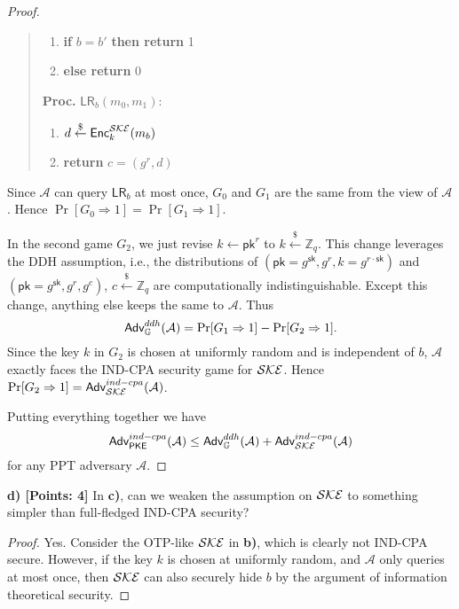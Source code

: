 \documentclass[12pt]{article}
\newcommand{\Z}{\mathbb{Z}}
\newcommand{\getsr}{\stackrel{\$}{\gets}}
\newcommand{\Adv}{\textsf{Adv}}
\theoremstyle{definition}
\newcommand{\PKE}{\textsf{PKE}}
\newcommand{\Enc}{\textsf{Enc}}
\newcommand{\pk}{\textsf{pk}}
\newcommand{\sk}{\textsf{sk}}
\newcommand{\A}{\mathcal{A}}
\newcommand{\LR}{\textsf{LR}}
\begin{document}
\begin{proof}
\begin{quote}
\begin{minipage}[t]{0.4\textwidth}
\begin{enumerate}
\item {\bf if} $b=b'$ {\bf then return} 1
\item {\bf else return} 0
\end{enumerate}
\end{minipage}
\begin{minipage}[t]{0.4\textwidth}
{\bf Proc.} $\LR_b(m_0, m_1)$:
\begin{enumerate}
\item $d \getsr \Enc_k^\SKE(m_b)$
\item {\bf return} $c=(g^r,d)$
\end{enumerate}
\end{minipage}
\end{quote}
Since $\A$ can query $\LR_b$ at most once, $G_0$ and $G_1$ are the same from the view of $\A$. Hence $\Pr[G_0 \Rightarrow 1] = \Pr[G_1 \Rightarrow 1]$.

In the second game $G_2$, we just revise $k \gets \pk^r$ to $k \getsr \Z_q$. This change leverages the DDH assumption, i.e., the distributions of $(\pk = g^\sk, g^r, k=g^{r\cdot\sk})$ and $(\pk = g^\sk, g^r, g^c)$, $c \getsr \Z_q$ are computationally indistinguishable. Except this change, anything else keeps the same to $\A$. Thus
$$\Adv_{\G}^{ddh}(\A) = \Pr[G_1 \Rightarrow 1] - \Pr[G_2 \Rightarrow 1].$$
Since the key $k$ in $G_2$ is chosen at uniformly random and is independent of $b$, $\A$ exactly faces the IND-CPA security game for $\mathcal{SKE}$. Hence $\Pr[G_2 \Rightarrow 1] = \Adv_{\SKE}^{ind-cpa}(\A)$.

Putting everything together we have 
$$\Adv_{\PKE}^{ind-cpa}(\A) \leq \Adv_{\G}^{ddh}(\A) + \Adv_{\SKE}^{ind-cpa}(\A)$$
for any PPT adversary $\A$.
\end{proof}

{\bf d) [Points: 4]} In {\bf c)}, can we weaken the assumption on $\mathcal{SKE}$ to something simpler than full-fledged IND-CPA security?
\begin{proof}
Yes. Consider the OTP-like $\mathcal{SKE}$ in {\bf b)}, which is clearly not IND-CPA secure. However, if the key $k$ is chosen at uniformly random, and $\A$ only queries at most once, then $\mathcal{SKE}$ can also securely hide $b$ by the argument of information theoretical security.
\end{proof}
\end{document}
